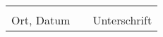 \begin{flushleft}
    \begin{tabular}{lp{2em}l}
        \hspace{5cm}   && \hspace{5cm} \\\cline{1-1}\cline{3-3}
        Ort, Datum     && Unterschrift
    \end{tabular}
\end{flushleft}